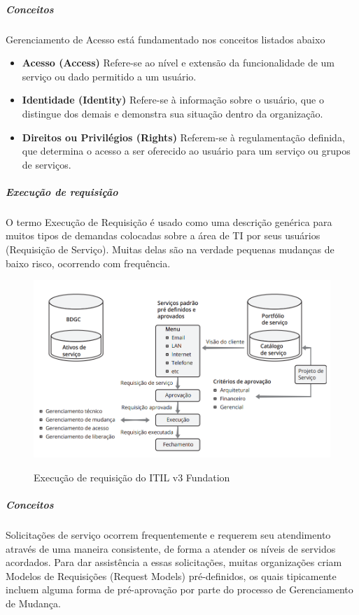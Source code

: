 \subparagraph*{Conceitos}
Gerenciamento de Acesso está fundamentado nos conceitos listados abaixo
\begin{itemize}[noitemsep]
	\item {\bfseries Acesso (Access) }
		Refere-se ao nível e extensão da funcionalidade de um serviço ou dado permitido a um usuário.
	\item {\bfseries Identidade (Identity) }
		Refere-se à informação sobre o usuário, que o distingue dos demais e demonstra sua situação 				dentro da organização.
	\item {\bfseries  Direitos ou Privilégios (Rights) }
		Referem-se à regulamentação definida, que determina o acesso a ser oferecido ao usuário
		para um serviço ou grupos de serviços.
\end{itemize}





\subparagraph{Execução de requisição}
O termo Execução de Requisição é usado como uma descrição genérica para muitos tipos de demandas colocadas sobre a área de TI por seus usuários (Requisição de Serviço).
Muitas delas são na verdade pequenas mudanças de baixo risco, ocorrendo com frequência.



\begin{figure}[!h]
\caption{Execução de requisição do ITIL v3 Fundation}
\centering %
\includegraphics[width=15cm]{itil_images/execucao_de_requisicao.png}
\label{figura:Execução de requisiçao retirado do ITIL v3 Fundation}
\end{figure}




\subparagraph*{Conceitos}
Solicitações de serviço ocorrem frequentemente e requerem seu atendimento através de
uma maneira consistente, de forma a atender os níveis de servidos acordados. Para dar
assistência a essas solicitações, muitas organizações criam Modelos de Requisições (Request
Models) pré-definidos, os quais tipicamente incluem alguma forma de pré-aprovação por
parte do processo de Gerenciamento de Mudança.

